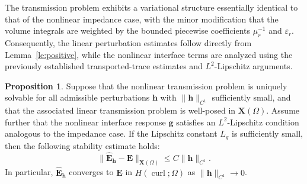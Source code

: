 \documentclass[12pt,reqno]{amsart}
\theoremstyle{definition}
\newtheorem{prop}[theo]{Proposition}
\numberwithin{equation}{section}
\begin{document}
The transmission problem exhibits a variational structure essentially identical to that of the nonlinear impedance case, with the minor modification that the volume integrals are weighted by the bounded piecewise coefficients $\mu_r^{-1}$ and $\varepsilon_r$. Consequently, the linear perturbation estimates follow directly from Lemma~\ref{le:positive}, while the nonlinear interface terms are analyzed using the previously established transported-trace estimates and $L^2$-Lipschitz arguments.


\begin{prop}\label{prop:continuity_ntc}
Suppose that the nonlinear transmission problem is uniquely solvable for all admissible perturbations $\mathbf{h}$ with $\|\mathbf{h}\|_{C^1}$ sufficiently small, and that the associated linear transmission problem is well-posed in $\mathbf{X}(\Omega)$. Assume further that the nonlinear interface response $\mathbf{g}$ satisfies an $L^2$-Lipschitz condition analogous to the impedance case. If the Lipschitz constant $L_g$ is sufficiently small, then the following stability estimate holds:
\[
\|\hat{\mathbf{E}}_{\mathbf{h}} - \mathbf{E}\|_{\mathbf{X}(\Omega)} \le C \|\mathbf{h}\|_{C^1}.
\]
In particular, $\hat{\mathbf{E}}_{\mathbf{h}}$ converges to $\mathbf{E}$ in $H(\operatorname{curl}; \Omega)$ as $\|\mathbf{h}\|_{C^1} \to 0$.
\end{prop}
\end{document}
